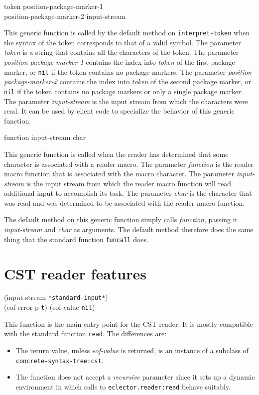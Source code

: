  {token position-package-marker-1\\
  position-package-marker-2 input-stream}

This generic function is called by the default method on
\texttt{interpret-token} when the syntax of the token corresponds to
that of a valid symbol.  The parameter \textit{token} is a string that
contains all the characters of the token.  The parameter
\textit{position-package-marker-1} contains the index into
\textit{token} of the first package marker, or \texttt{nil} if the
token contains no package markers.  The parameter
\textit{position-package-marker-2} contains the index into
\textit{token} of the second package marker, or \texttt{nil} if the
token contains no package markers or only a single package marker.
The parameter \textit{input-stream} is the input stream from which the
characters were read.  It can be used by client code to specialize the
behavior of this generic function.

 {function input-stream char}

This generic function is called when the reader has determined that
some character is associated with a reader macro.  The parameter
\textit{function} is the reader macro function that is associated with
the macro character.  The parameter \textit{input-stream} is the input
stream from which the reader macro function will read additional input
to accomplish its task.  The parameter \textit{char} is the character
that was read and was determined to be associated with the reader
macro function.

The default method on this generic function simply calls
\textit{function}, passing it \textit{input-stream} and \textit{char}
as arguments.  The default method therefore does the same thing that
the standard \commonlisp{} function \texttt{funcall} does.

\section{CST reader features}

 {\optional (input-stream \texttt{*standard-input*})\\
  (eof-error-p \texttt{t})
  (eof-value \texttt{nil})}

This function is the main entry point for the CST reader.  It is
mostly compatible with the standard \commonlisp{} function
\texttt{read}.  The differences are:

\begin{itemize}
\item The return value, unless \textit{eof-value} is returned, is an
  instance of a subclass of \texttt{concrete-syntax-tree:cst}.
\item The function does not accept a \textit{recursive} parameter
  since it sets up a dynamic environment in which calls to
  \texttt{eclector.reader:read} behave suitably.
\end{itemize}
